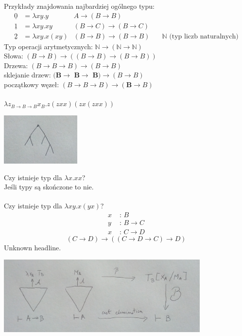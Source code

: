 \documentclass[10pt,a4paper]{article}
\theoremstyle{plain}
\theoremstyle{definition}
\begin{document}
Przykłady znajdowania najbardziej ogólnego typu:
\begin{align*}
\underline{0} & = \lambda xy. y  & A \rightarrow (B \rightarrow B) &\\
\underline{1} & = \lambda xy. xy  & (B \rightarrow C) \rightarrow (B \rightarrow C) &\\
\underline{2} & = \lambda xy. x(xy) &  (B \rightarrow B) \rightarrow (B \rightarrow B) & \quad \mathbb{N} \text{ (typ liczb naturalnych)}
\end{align*}
Typ operacji arytmetycznych: $\mathbb{N} \rightarrow(\mathbb{N} \rightarrow\mathbb{N})$\\
Słowa: $(B\rightarrow B) \rightarrow ((B\rightarrow B) \rightarrow (B\rightarrow B))$\\
Drzewa: $(B\rightarrow B\rightarrow B) \rightarrow (B \rightarrow B)$\\
sklejanie drzew: $\textbf{(B$\rightarrow$ B$\rightarrow$ B)} \rightarrow (B \rightarrow B)$\\
początkowy węzeł: $(B\rightarrow B\rightarrow B) \rightarrow (\textbf{B} \rightarrow B)$\\
\\
$\lambda z_{B\rightarrow B\rightarrow B} x_B . z(zxx)(zx(zxx))$
\begin{center}
\includegraphics[width=0.3\textwidth]{img/lambdaTermJakoDrzewo}
\end{center}
Czy istnieje typ dla $\lambda x . xx$?\\
Jeśli typy są skończone to nie.\\
\\
Czy istnieje typ dla $\lambda xy . x(yx)$?
\begin{align*}
x &\text{ : } B\\
y &\text{ : } B \rightarrow C\\
x &\text{ : } C \rightarrow D
\end{align*}
$$(C\rightarrow D)\rightarrow((C\rightarrow D \rightarrow C)\rightarrow D)$$
Unknown headline.
\begin{center}
\includegraphics[width=0.8\textwidth]{img/rysunekWKtorymNieWiemOCoChodzi}
\end{center}
\end{document}
